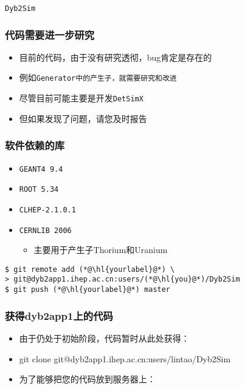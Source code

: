 
\begin{frame}
    \begin{center}
        \LARGE \tt{Dyb2Sim}
    \end{center}
\end{frame}

\begin{frame}
    \frametitle{代码需要进一步研究}
    \begin{itemize}
        \item 目前的代码，由于没有研究透彻，bug肯定是存在的
        \item 例如\tt{Generator}中的产生子，就需要研究和改进
        \item 尽管目前可能主要是开发\tt{DetSimX}
        \item 但如果发现了问题，请您及时报告
    \end{itemize}
\end{frame}

\begin{frame}
    \frametitle{软件依赖的库}
    \begin{itemize}
        \item \tt{GEANT4 9.4}
        \item \tt{ROOT 5.34}
        \item \tt{CLHEP-2.1.0.1}
        \item \tt{CERNLIB 2006}
            \begin{itemize}
                \item 主要用于产生子Thorium和Uranium
            \end{itemize}
    \end{itemize}
\end{frame}

\newsavebox{\DybSimAddRemote}
\begin{lrbox}{\DybSimAddRemote}
\begin{lstlisting}
$ git remote add (*@\hl{yourlabel}@*) \
> git@dyb2app1.ihep.ac.cn:users/(*@\hl{you}@*)/Dyb2Sim
$ git push (*@\hl{yourlabel}@*) master
\end{lstlisting}
\end{lrbox}

\begin{frame}
    \frametitle{获得dyb2app1上的代码}
    \begin{itemize}
        \item 由于仍处于初始阶段，代码暂时从此处获得：
        \item {\scriptsize git clone git@dyb2app1.ihep.ac.cn:users/lintao/Dyb2Sim}
        \item 为了能够把您的代码放到服务器上：
    \end{itemize}
    \par\usebox{\DybSimAddRemote}
\end{frame}

